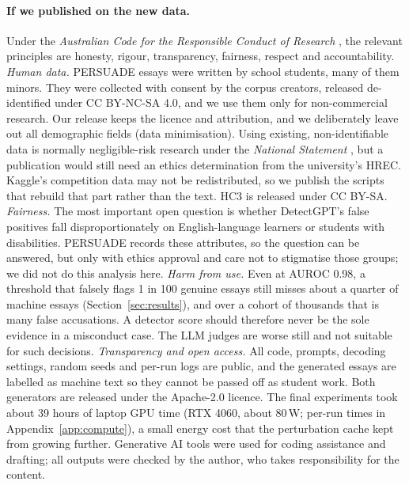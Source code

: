 \documentclass[11pt]{article}
\begin{document}
\paragraph{If we published on the new data.} Under the \textit{Australian Code for the Responsible Conduct of Research} \citep{nhmrc2018code}, the relevant principles are honesty, rigour, transparency, fairness, respect and accountability.
\emph{Human data.} PERSUADE essays were written by school students, many of them minors. They were collected with consent by the corpus creators, released de-identified under CC BY-NC-SA 4.0, and we use them only for non-commercial research. Our release keeps the licence and attribution, and we deliberately leave out all demographic fields (data minimisation). Using existing, non-identifiable data is normally negligible-risk research under the \textit{National Statement} \citep{nhmrc2023national}, but a publication would still need an ethics determination from the university's HREC. Kaggle's competition data may not be redistributed, so we publish the scripts that rebuild that part rather than the text. HC3 is released under CC BY-SA.
\emph{Fairness.} The most important open question is whether DetectGPT's false positives fall disproportionately on English-language learners or students with disabilities. PERSUADE records these attributes, so the question can be answered, but only with ethics approval and care not to stigmatise those groups; we did not do this analysis here.
\emph{Harm from use.} Even at AUROC 0.98, a threshold that falsely flags 1 in 100 genuine essays still misses about a quarter of machine essays (Section~\ref{sec:results}), and over a cohort of thousands that is many false accusations. A detector score should therefore never be the sole evidence in a misconduct case. The LLM judges are worse still and not suitable for such decisions.
\emph{Transparency and open access.} All code, prompts, decoding settings, random seeds and per-run logs are public, and the generated essays are labelled as machine text so they cannot be passed off as student work. Both generators are released under the Apache-2.0 licence. The final experiments took about 39 hours of laptop GPU time (RTX 4060, about 80\,W; per-run times in Appendix~\ref{app:compute}), a small energy cost that the perturbation cache kept from growing further. Generative AI tools were used for coding assistance and drafting; all outputs were checked by the author, who takes responsibility for the content.

\end{document}
